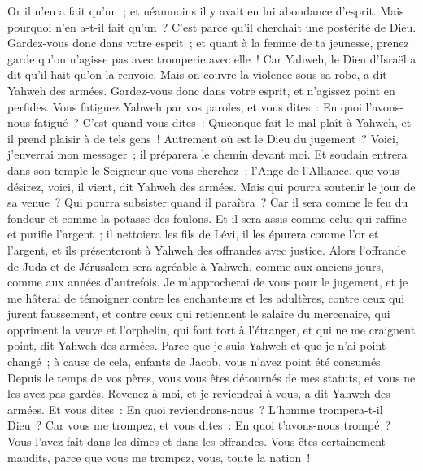 \begin{multicols}{2}
Or il n'en a fait qu'un~; et néanmoins il y avait en lui abondance d'esprit. Mais pourquoi n'en a-t-il fait qu'un~? C'est parce qu'il cherchait une postérité de Dieu. Gardez-vous donc dans votre esprit~; et quant à la femme de ta jeunesse, prenez garde qu'on n'agisse pas avec tromperie avec elle~!
Car Yahweh, le Dieu d'Israël a dit qu'il hait qu'on la renvoie. Mais on couvre la violence sous sa robe, a dit Yahweh des armées. Gardez-vous donc dans votre esprit, et n'agissez point en perfides.
Vous fatiguez Yahweh par vos paroles, et vous dites~: En quoi l'avons-nous fatigué~? C'est quand vous dites~: Quiconque fait le mal plaît à Yahweh, et il prend plaisir à de tels gens~! Autrement où est le Dieu du jugement~?
\VerseOne{}Voici, j'enverrai mon messager~; il préparera le chemin devant moi. Et soudain entrera dans son temple le Seigneur que vous cherchez~; l'Ange de l'Alliance, que vous désirez, voici, il vient, dit Yahweh des armées.
Mais qui pourra soutenir le jour de sa venue~? Qui pourra subsister quand il paraîtra~? Car il sera comme le feu du fondeur et comme la potasse des foulons.
Et il sera assis comme celui qui raffine et purifie l'argent~; il nettoiera les fils de Lévi, il les épurera comme l'or et l'argent, et ils présenteront à Yahweh des offrandes avec justice.
Alors l'offrande de Juda et de Jérusalem sera agréable à Yahweh, comme aux anciens jours, comme aux années d'autrefois.
Je m'approcherai de vous pour le jugement, et je me hâterai de témoigner contre les enchanteurs et les adultères, contre ceux qui jurent faussement, et contre ceux qui retiennent le salaire du mercenaire, qui oppriment la veuve et l'orphelin, qui font tort à l'étranger, et qui ne me craignent point, dit Yahweh des armées.
Parce que je suis Yahweh et que je n'ai point changé~; à cause de cela, enfants de Jacob, vous n'avez point été consumés.
Depuis le temps de vos pères, vous vous êtes détournés de mes statuts, et vous ne les avez pas gardés. Revenez à moi, et je reviendrai à vous, a dit Yahweh des armées. Et vous dites~: En quoi reviendrons-nous~?
L'homme trompera-t-il Dieu~? Car vous me trompez, et vous dites~: En quoi t'avons-nous trompé~? Vous l'avez fait dans les dîmes et dans les offrandes.
Vous êtes certainement maudits, parce que vous me trompez, vous, toute la nation~!

\end{multicols}

